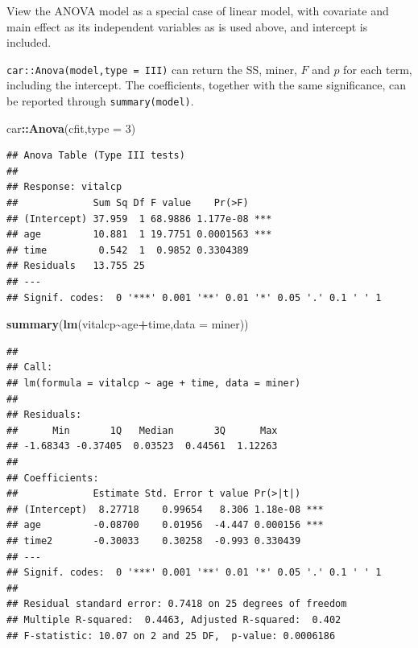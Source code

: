 \documentclass[
]{ctexart}
\newenvironment{Shaded}{\begin{snugshade}}{\end{snugshade}}
\newcommand{\AttributeTok}[1]{\textcolor[rgb]{0.13,0.29,0.53}{#1}}
\newcommand{\FunctionTok}[1]{\textcolor[rgb]{0.13,0.29,0.53}{\textbf{#1}}}
\newcommand{\NormalTok}[1]{#1}
\newcommand{\SpecialCharTok}[1]{\textcolor[rgb]{0.81,0.36,0.00}{\textbf{#1}}}
\newcommand{\StringTok}[1]{\textcolor[rgb]{0.31,0.60,0.02}{#1}}
\begin{document}
View the ANOVA model as a special case of linear model, with covariate
and main effect as its independent variables as is used above, and
intercept is included.

\texttt{car::Anova(model,type\ =\ \textquotesingle{}III\textquotesingle{})}
can return the SS, miner, \(F\) and \(p\) for each term, including the
intercept. The coefficients, together with the same significance, can be
reported through \texttt{summary(model)}.

\begin{Shaded}
\begin{Highlighting}[]
\NormalTok{car}\SpecialCharTok{::}\FunctionTok{Anova}\NormalTok{(cfit,}\AttributeTok{type =} \StringTok{\textquotesingle{}3\textquotesingle{}}\NormalTok{)}
\end{Highlighting}
\end{Shaded}

\begin{verbatim}
## Anova Table (Type III tests)
## 
## Response: vitalcp
##             Sum Sq Df F value    Pr(>F)    
## (Intercept) 37.959  1 68.9886 1.177e-08 ***
## age         10.881  1 19.7751 0.0001563 ***
## time         0.542  1  0.9852 0.3304389    
## Residuals   13.755 25                      
## ---
## Signif. codes:  0 '***' 0.001 '**' 0.01 '*' 0.05 '.' 0.1 ' ' 1
\end{verbatim}

\begin{Shaded}
\begin{Highlighting}[]
\FunctionTok{summary}\NormalTok{(}\FunctionTok{lm}\NormalTok{(vitalcp}\SpecialCharTok{\textasciitilde{}}\NormalTok{age}\SpecialCharTok{+}\NormalTok{time,}\AttributeTok{data =}\NormalTok{ miner))}
\end{Highlighting}
\end{Shaded}

\begin{verbatim}
## 
## Call:
## lm(formula = vitalcp ~ age + time, data = miner)
## 
## Residuals:
##      Min       1Q   Median       3Q      Max 
## -1.68343 -0.37405  0.03523  0.44561  1.12263 
## 
## Coefficients:
##             Estimate Std. Error t value Pr(>|t|)    
## (Intercept)  8.27718    0.99654   8.306 1.18e-08 ***
## age         -0.08700    0.01956  -4.447 0.000156 ***
## time2       -0.30033    0.30258  -0.993 0.330439    
## ---
## Signif. codes:  0 '***' 0.001 '**' 0.01 '*' 0.05 '.' 0.1 ' ' 1
## 
## Residual standard error: 0.7418 on 25 degrees of freedom
## Multiple R-squared:  0.4463, Adjusted R-squared:  0.402 
## F-statistic: 10.07 on 2 and 25 DF,  p-value: 0.0006186
\end{verbatim}
\end{document}
